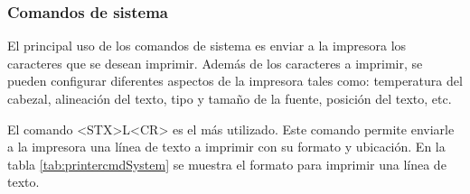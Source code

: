 \subsubsection{Comandos de sistema}

El principal uso de los comandos de sistema es enviar a la impresora los caracteres que se desean imprimir. Además de los caracteres a imprimir, se pueden configurar diferentes aspectos de la impresora tales como: temperatura del cabezal, alineación del texto, tipo y tamaño de la fuente, posición del texto, etc.

El comando \textless{}STX\textgreater{}L\textless{}CR\textgreater{} es el más utilizado. Este comando permite enviarle a la impresora una línea de texto a imprimir con su formato y ubicación. En la tabla \ref{tab:printercmdSystem} se muestra el formato para imprimir una línea de texto. %

